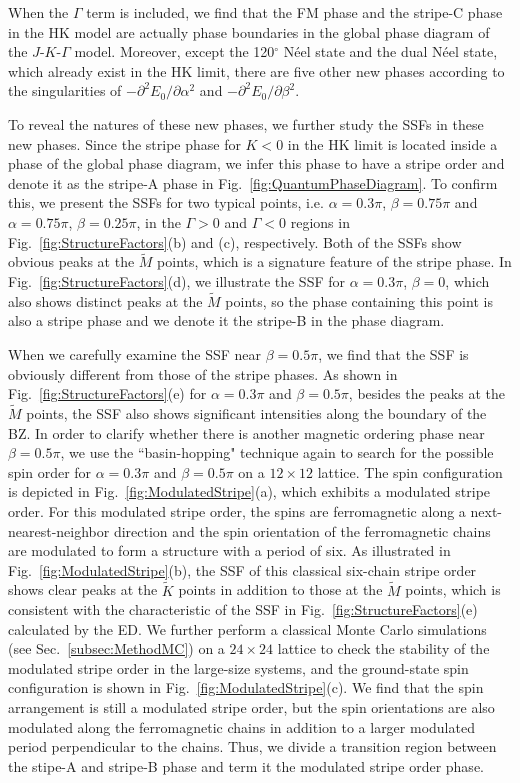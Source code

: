 \documentclass[aps,prb,reprint,amsfonts,amsmath,amssymb,showpacs,groupedaddress,superscriptaddress]{revtex4-1}
\begin{document}
When the $\Gamma$ term is included, we find that the FM phase and the stripe-C phase in the HK model are actually phase boundaries in the global phase diagram of the $J$-$K$-$\Gamma$ model. Moreover, except the 120$^\circ$ N\'{e}el state and the dual N\'{e}el state, which already exist in the HK limit, there are five other new phases according to the singularities of $-\partial^2E_0/\partial\alpha^2$ and $-\partial^2E_0/\partial\beta^2$.

To reveal the natures of these new phases, we further study the SSFs in these new phases. Since the stripe phase for $K<0$ in the HK limit is located inside a phase of the global phase diagram, we infer this phase to have a stripe order and denote it as the stripe-A phase in Fig.~\ref{fig:QuantumPhaseDiagram}. To confirm this, we present the SSFs for two typical points, i.e. $\alpha=0.3\pi$, $\beta=0.75\pi$ and $\alpha=0.75\pi$, $\beta=0.25\pi$, in the $\Gamma>0$ and $\Gamma<0$ regions in Fig.~\ref{fig:StructureFactors}(b) and (c), respectively. Both of the SSFs show obvious peaks at the $\tilde{M}$ points, which is a signature feature of the stripe phase. In Fig.~\ref{fig:StructureFactors}(d), we illustrate the SSF for $\alpha=0.3\pi$, $\beta=0$, which also shows distinct peaks at the $\tilde{M}$ points, so the phase containing this point is also a stripe phase and we denote it the stripe-B in the phase diagram.

When we carefully examine the SSF near $\beta=0.5\pi$, we find that the SSF is obviously different from those of the stripe phases. As shown in Fig.~\ref{fig:StructureFactors}(e) for $\alpha=0.3\pi$ and $\beta=0.5\pi$, besides the peaks at the $\tilde{M}$ points, the SSF also shows significant intensities along the boundary of the BZ. In order to clarify whether there is another magnetic ordering phase near $\beta=0.5\pi$, we use the ``basin-hopping" technique again to search for the possible spin order for $\alpha=0.3\pi$ and $\beta=0.5\pi$ on a $12 \times 12$ lattice. The spin configuration is depicted in Fig.~\ref{fig:ModulatedStripe}(a), which exhibits a modulated stripe order. For this modulated stripe order, the spins are ferromagnetic along a next-nearest-neighbor direction and the spin orientation of the ferromagnetic chains are modulated to form a structure with a period of six. As illustrated in Fig.~\ref{fig:ModulatedStripe}(b), the SSF of this classical six-chain stripe order shows clear peaks at the $\tilde{K}$ points in addition to those at the $\tilde{M}$ points, which is consistent with the characteristic of the SSF in Fig.~\ref{fig:StructureFactors}(e) calculated by the ED. We further perform a classical Monte Carlo simulations (see Sec.~\ref{subsec:MethodMC}) on a $24 \times24$ lattice to check the stability of the modulated stripe order in the large-size systems, and the ground-state spin configuration is shown in Fig.~\ref{fig:ModulatedStripe}(c). We find that the spin arrangement is still a modulated stripe order, but the spin orientations are also modulated along the ferromagnetic chains in addition to a larger modulated period perpendicular to the chains. Thus, we divide a transition region between the stipe-A and stripe-B phase and term it the modulated stripe order phase.
\end{document}
